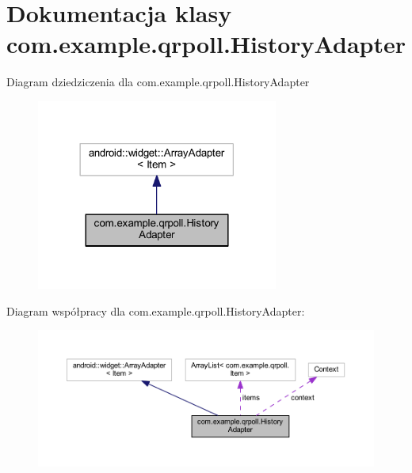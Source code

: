 \hypertarget{classcom_1_1example_1_1qrpoll_1_1_history_adapter}{\section{Dokumentacja klasy com.\+example.\+qrpoll.\+History\+Adapter}
\label{classcom_1_1example_1_1qrpoll_1_1_history_adapter}
}


Diagram dziedziczenia dla com.\+example.\+qrpoll.\+History\+Adapter
\nopagebreak
\begin{figure}[H]
\begin{center}
\leavevmode
\includegraphics[width=225pt]{classcom_1_1example_1_1qrpoll_1_1_history_adapter__inherit__graph}
\end{center}
\end{figure}


Diagram współpracy dla com.\+example.\+qrpoll.\+History\+Adapter\+:
\nopagebreak
\begin{figure}[H]
\begin{center}
\leavevmode
\includegraphics[width=350pt]{classcom_1_1example_1_1qrpoll_1_1_history_adapter__coll__graph}
\end{center}
\end{figure}
